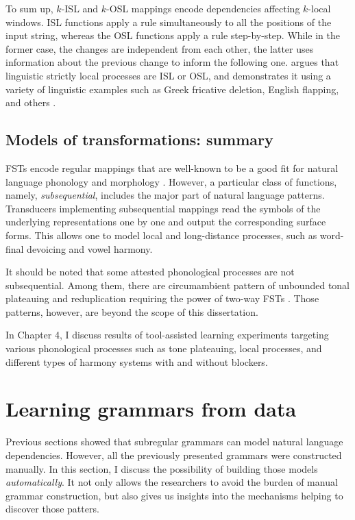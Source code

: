 To sum up, $k$-ISL and $k$-OSL mappings encode dependencies affecting $k$-local windows.
ISL functions apply a rule simultaneously to all the positions of the input string, whereas the OSL functions apply a rule step-by-step.
While in the former case, the changes are independent from each other, the latter uses information about the previous change to inform the following one.
\cite{Chandlee2014} argues that linguistic strictly local processes are ISL or OSL, and demonstrates it using a variety of linguistic examples such as Greek fricative deletion, English flapping, and others \citep{JosephPhilippakiWarburton1987}.




\subsection{Models of transformations: summary}


FSTs encode regular mappings that are well-known to be a good fit for natural language phonology and morphology \citep{Johnson1972,KaplanKay94,BeesleyKartunnen03}.
However, a particular class of functions, namely, \emph{subsequential}, includes the major part of natural language patterns.
Transducers implementing subsequential mappings read the symbols of the underlying representations one by one and output the corresponding surface forms.
This allows one to model local and long-distance processes, such as word-final devoicing and vowel harmony.

It should be noted that some attested phonological processes are not subsequential.
Among them, there are circumambient pattern of unbounded tonal plateauing and reduplication requiring the power of two-way FSTs \citep{Jardine2016,DolatianHeinz2018}.
Those patterns, however, are beyond the scope of this dissertation.


In Chapter 4, I discuss results of tool-assisted learning experiments targeting various phonological processes such as tone plateauing, local processes, and different types of harmony systems with and without blockers.





\section{Learning grammars from data}
\label{learningframework}


Previous sections showed that subregular grammars can model natural language dependencies.
However, all the previously presented grammars were constructed manually.
In this section, I discuss the possibility of building those models \emph{automatically}.
It not only allows the researchers to avoid the burden of manual grammar construction, but also gives us insights into the mechanisms helping to discover those patters.


